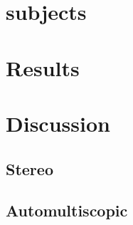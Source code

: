 \section{subjects}

\section{Results}

\section {Discussion}
\subsection{Stereo}
\subsection{Automultiscopic}




